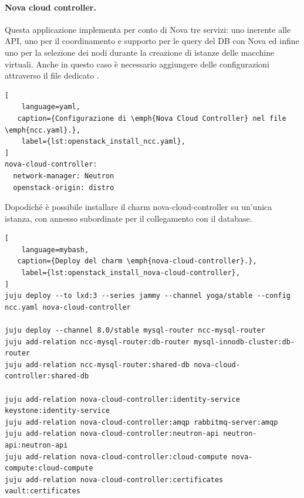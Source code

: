 \paragraph{Nova cloud controller.}
Questa applicazione implementa per conto di Nova tre servizi: uno inerente alle API, uno per il coordinamento e supporto per le query del DB con Nova ed infine uno per la selezione dei nodi durante la creazione di istanze delle macchine virtuali.
% 
Anche in questo caso è necessario aggiungere delle configurazioni attraverso il file dedicato .
\begin{lstlisting}[
    language=yaml, 
   caption={Configurazione di \emph{Nova Cloud Controller} nel file \emph{ncc.yaml}.},
    label={lst:openstack_install_ncc.yaml},
]
nova-cloud-controller:
  network-manager: Neutron
  openstack-origin: distro
\end{lstlisting}

\noindent
Dopodiché è possibile installare il charm nova-cloud-controller su un'unica istanza, con annesso subordinate per il collegamento con il database.
\begin{lstlisting}[
    language=mybash, 
   caption={Deploy del charm \emph{nova-cloud-controller}.},
    label={lst:openstack_install_nova-cloud-controller},
]
juju deploy --to lxd:3 --series jammy --channel yoga/stable --config ncc.yaml nova-cloud-controller

juju deploy --channel 8.0/stable mysql-router ncc-mysql-router
juju add-relation ncc-mysql-router:db-router mysql-innodb-cluster:db-router
juju add-relation ncc-mysql-router:shared-db nova-cloud-controller:shared-db

juju add-relation nova-cloud-controller:identity-service keystone:identity-service
juju add-relation nova-cloud-controller:amqp rabbitmq-server:amqp
juju add-relation nova-cloud-controller:neutron-api neutron-api:neutron-api
juju add-relation nova-cloud-controller:cloud-compute nova-compute:cloud-compute
juju add-relation nova-cloud-controller:certificates vault:certificates
\end{lstlisting}



